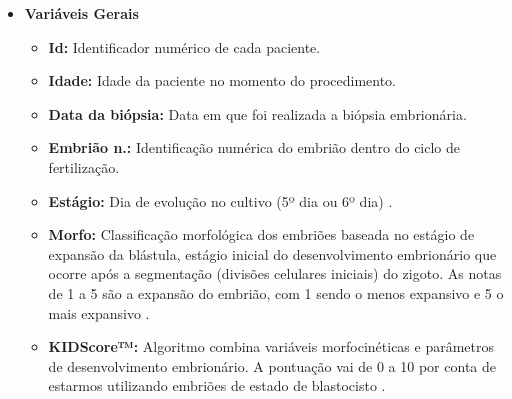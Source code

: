\begin{apendicesenv}
\begin{itemize}
  \item \textbf{Variáveis Gerais}
  \begin{itemize}
      \item \textbf{Id:} Identificador numérico de cada paciente.
      \item \textbf{Idade:} Idade da paciente no momento do procedimento.
      \item \textbf{Data da biópsia:} Data em que foi realizada a biópsia embrionária.
      \item \textbf{Embrião n.:} Identificação numérica do embrião dentro do ciclo de fertilização.
      \item \textbf{Estágio:} Dia de evolução no cultivo (5º dia ou 6º dia) \cite{ramalho2024}.
      \item \textbf{Morfo:} Classificação morfológica dos embriões baseada no estágio de expansão da blástula, estágio inicial do desenvolvimento embrionário que ocorre após a segmentação (divisões celulares iniciais) do zigoto. As notas de 1 a 5 são a expansão do embrião, com 1 sendo o menos expansivo e 5 o mais expansivo \cite{ramalho2024}.
      \item \textbf{KIDScore™:} Algoritmo combina variáveis morfocinéticas e parâmetros de desenvolvimento embrionário. A pontuação vai de 0 a 10 por conta de estarmos utilizando embriões de estado de blastocisto \cite{gazzo2020}. 
  \end{itemize}
\end{itemize}


\end{apendicesenv}
